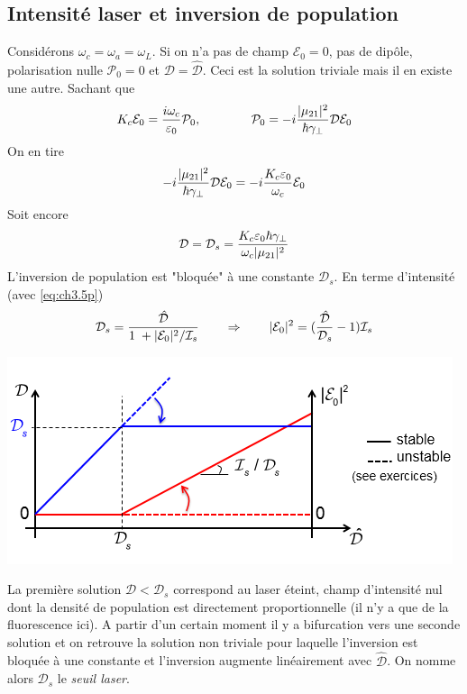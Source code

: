 \subsection{Intensité laser et inversion de population}
Considérons $\omega_c=\omega_a=\omega_L$. Si on n'a pas de champ $\mathcal{E}_0=0$, pas de dipôle, polarisation nulle $\mathcal{P}_0=0$ et $\mathcal{D}=\hat{\mathcal{D}}$. Ceci est la solution 
triviale mais il en existe une autre. Sachant que 
\begin{equation}
{K_c}{{\cal E}_0} = \frac{{i{\omega _c}}}{{{\varepsilon _0}}}{{\cal P}_0},\qquad\qquad 
{{\cal P}_0} =  - i\frac{{|{\mu _{21}}{|^2}}}{{\hbar {\gamma _ \bot }}}{\cal D}{{\cal E}_0}
\end{equation}
On en tire
\begin{equation}
 - i\frac{{|{\mu _{21}}{|^2}}}{{\hbar {\gamma _ \bot }}}{\cal D}{{\cal E}_0} =  - i\frac{{{K_c}{\varepsilon _0}}}{{{\omega _c}}}{{\cal E}_0}
\end{equation}
Soit encore
\begin{equation}
{\cal D} = {{\cal D}_s} = \frac{{{K_c}{\varepsilon _0}\hbar {\gamma _ \bot }}}{{{\omega _c}|{\mu _{21}}{|^2}}}
\end{equation}
L'inversion de population est "bloquée" à une constante $\mathcal{D}_s$. En terme d'intensité (avec
\eqref{eq:ch3.5p})
\begin{equation}
{{{\cal D}}_s} = \frac{{{\hat {\cal D}}}}{{1\; + |{{\cal E}_0}{|^2}/{{{\cal I}}_s}}}
\qquad\Rightarrow\qquad |{{\cal E}_0}{|^2} = (\frac{{{\hat {\cal D}}}}{{{{{\cal D}}_s}}} - 1){{{\cal I}}_s}
\end{equation}
\begin{center}
	\includegraphics[scale=0.7]{ch3/image8.png}
\end{center}
La première solution $\mathcal{D}<\mathcal{D}_s$ correspond au laser éteint, champ d'intensité nul 
dont la densité de population est directement proportionnelle (il n'y a que de la fluorescence ici). A partir d'un certain moment il y a bifurcation vers une seconde solution et on retrouve la solution 
non triviale pour laquelle l'inversion est bloquée à une constante et l'inversion augmente 
linéairement avec $\hat{\mathcal{D}}$. On nomme alors $\mathcal{D}_s$ le \textit{seuil laser}.


























